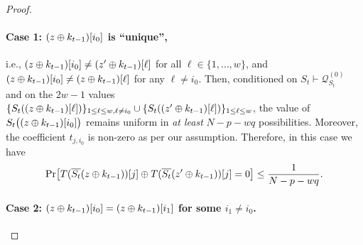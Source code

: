 \begin{proof}
	
	
	
	
	\paragraph{Case 1: $(z\oplus k_{t-1})[i_0]$ is ``unique'',}
	
	i.e., $(z\oplus k_{t-1})[i_0]\neq(z'\oplus k_{t-1})[\ell]$ for all $\ell\in\{1,\ldots,w\}$, and $(z\oplus k_{t-1})[i_0]\neq(z\oplus k_{t-1})[\ell]$ for any $\ell\neq i_0$. Then, conditioned on $S_t\vdash\mathcal{Q}_{S_t}^{(0)}$ and on the $2w-1$ values $\{S_t((z\oplus k_{t-1})[\ell])\}_{1\leq \ell\leq w,\ell\neq i_0}\cup\{S_t((z'\oplus k_{t-1})[\ell])\}_{1\leq \ell\leq w}$, the value of $S_t\big((z\oplus k_{t-1})[i_0]\big)$ remains uniform in {\it at least} $N-p-wq$ possibilities. Moreover, the coefficient $t_{j,i_0}$ is non-zero as per our assumption. Therefore, in this case we have
	\begin{align}
	{\Pr}\big[T(\overline{S_t}(z\oplus k_{t-1}))[j]\oplus T(\overline{S_t}(z'\oplus k_{t-1}))[j]=0\big]\leq\frac{1}{N-p-wq}.
	\label{eq:bound-eq-B33}
	\end{align}
	
	
	\paragraph{Case 2: $(z\oplus k_{t-1})[i_0]=(z\oplus k_{t-1})[i_1]$ for some $i_1\neq i_0$.}
	

\end{proof}
